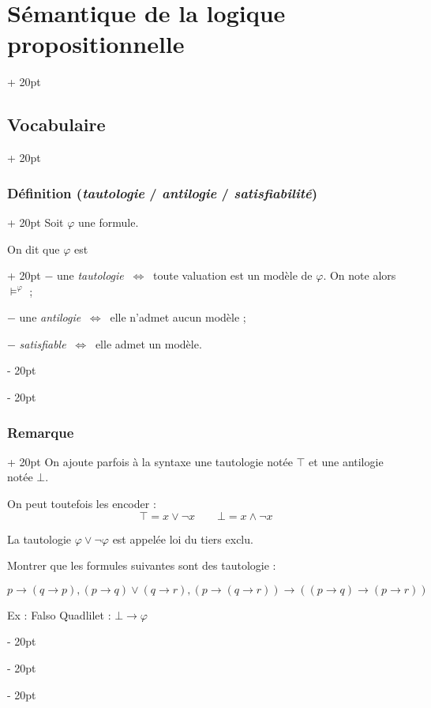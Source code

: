 \documentclass[a4paper, 12pt, twoside]{article}
\newcommand{\ssi}{\ \Leftrightarrow \ }
\newcommand{\ind}[1][20pt]{\advance\leftskip + #1}
\newcommand{\deind}[1][20pt]{\advance\leftskip - #1}
\newenvironment{indt}[2][20pt]{#2 \par \ind[#1]}{\par \deind} %
\begin{document}
\begin{indt}{\section{Sémantique de la logique propositionnelle}}
\begin{indt}{\subsection{Vocabulaire}}
            \begin{indt}{\subsubsection{Définition (\textit{tautologie} / \textit{antilogie} / \textit{satisfiabilité})}}
                Soit $\varphi$ une formule.
                
                \begin{indt}{On dit que $\varphi$ est}
                    $-$ une \textit{tautologie} $\ssi$ toute valuation est un modèle de $\varphi$. On note alors $\vDash^\varphi$ ;
                    
                    $-$ une \textit{antilogie} $\ssi$ elle n'admet aucun modèle ;
                    
                    $-$ \textit{satisfiable} $\ssi$ elle admet un modèle.
                \end{indt}
            \end{indt}
            
            \vspace{12pt}
            
            \begin{indt}{\subsubsection{Remarque}}
                On ajoute parfois à la syntaxe une tautologie notée $\top$ et une antilogie notée $\bot$.
                
                On peut toutefois les encoder :
                    \[ \top = x \vee \neg x \qquad \bot = x \wedge \neg x \]
                
                La tautologie $\varphi \vee \neg \varphi$ est appelée loi du tiers exclu.
                
                 Montrer que les formules suivantes sont des tautologie :
                
                $p \rightarrow (q \rightarrow p), (p \rightarrow q) \vee (q \rightarrow r), (p \rightarrow (q \rightarrow r)) \rightarrow ((p \rightarrow q) \rightarrow (p \rightarrow r))$
                
                \vspace{12pt}
                
                Ex : Falso Quadlilet : $\bot \rightarrow \varphi$
                

\end{indt}
\end{indt}
\end{indt}
\end{document}
